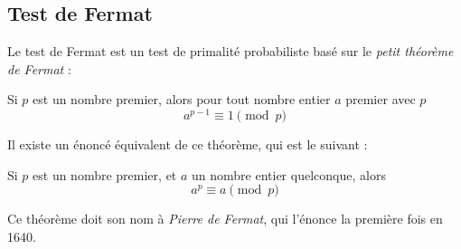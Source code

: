 \subsection{Test de Fermat}
	Le test de Fermat est un test de primalité probabiliste basé sur le \textit{petit théorème de Fermat} :
	
	\vspace{-1.5em}\begin{adjustwidth}{1.5cm}{1.5cm} 
	\begin{Th}
		\label{ThFermat1}
		Si $p$ est un nombre premier, alors pour tout nombre entier $a$ premier avec $p$
		\[a^{p-1}\equiv 1 \pmod p\]
	\end{Th}
	\end{adjustwidth}\vspace{0.5em}
	
	Il existe un énoncé équivalent de ce théorème, qui est le suivant :
	
	\vspace{-1.5em}\begin{adjustwidth}{1.5cm}{1.5cm} 
	\begin{Th}
		\label{ThFermat2}
		Si $p$ est un nombre premier, et $a$ un nombre entier quelconque, alors
		\[a^{p}\equiv a \pmod p\]
	\end{Th}
	\end{adjustwidth}\vspace{0.5em}
	
	Ce théorème doit son nom à \textit{Pierre de Fermat}, qui l'énonce la première fois en 1640. 
	
